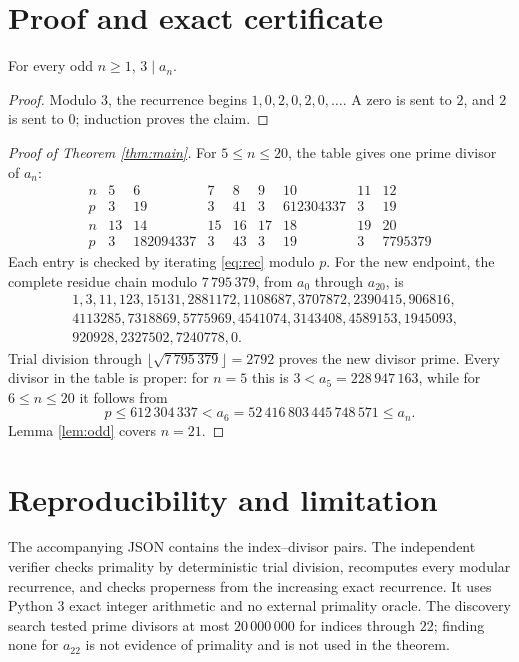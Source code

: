 \documentclass[11pt]{amsart}
\begin{document}
\section{Proof and exact certificate}
\begin{lemma}\label{lem:odd}For every odd $n\ge1$, $3\mid a_n$.\end{lemma}
\begin{proof}Modulo $3$, the recurrence begins $1,0,2,0,2,0,\ldots$.
A zero is sent to $2$, and $2$ is sent to $0$; induction proves the claim.\end{proof}
\begin{proof}[Proof of Theorem \ref{thm:main}]
For $5\le n\le20$, the table gives one prime divisor of $a_n$:
\[
\begin{array}{c|rrrrrrrr}n&5&6&7&8&9&10&11&12\\ \hline
p&3&19&3&41&3&612304337&3&19\\[2pt]
n&13&14&15&16&17&18&19&20\\ \hline
p&3&182094337&3&43&3&19&3&7795379\end{array}
\]
Each entry is checked by iterating \eqref{eq:rec} modulo $p$. For the new
endpoint, the complete residue chain modulo $7\,795\,379$, from $a_0$ through
$a_{20}$, is
\begin{align*}
&1,3,11,123,15131,2881172,1108687,3707872,2390415,906816,\\
&4113285,7318869,5775969,4541074,3143408,4589153,1945093,\\
&920928,2327502,7240778,0.
\end{align*}
Trial division through $\lfloor\sqrt{7\,795\,379}\rfloor=2792$ proves the
new divisor prime. Every divisor in the table is proper: for $n=5$ this is
$3<a_5=228\,947\,163$, while for $6\le n\le20$ it follows from
\[
  p\le 612\,304\,337<a_6=52\,416\,803\,445\,748\,571\le a_n.
\]
Lemma \ref{lem:odd} covers $n=21$.\end{proof}
\section{Reproducibility and limitation}
The accompanying JSON contains the index--divisor pairs. The independent
verifier checks primality by deterministic trial division, recomputes every
modular recurrence, and checks properness from the increasing exact recurrence.
It uses Python 3 exact integer arithmetic and no external primality oracle.
The discovery search tested prime divisors at most $20\,000\,000$ for indices
through $22$; finding none for $a_{22}$ is not evidence of primality and is not
used in the theorem.
\end{document}
